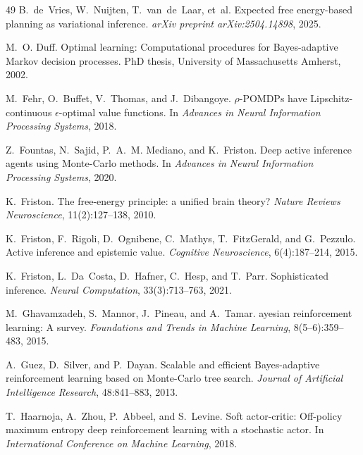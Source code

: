 \documentclass[runningheads]{llncs}
\begin{document}
\begin{thebibliography}{49}
B.~de~Vries, W.~Nuijten, T.~van~de~Laar, et~al.
\newblock Expected free energy-based planning as variational inference.
\newblock \emph{arXiv preprint arXiv:2504.14898}, 2025.

M.~O. Duff.
\newblock Optimal learning: Computational procedures for {B}ayes-adaptive {M}arkov decision processes.
\newblock PhD thesis, University of Massachusetts Amherst, 2002.

M.~Fehr, O.~Buffet, V.~Thomas, and J.~Dibangoye.
\newblock $\rho$-{POMDP}s have {L}ipschitz-continuous $\epsilon$-optimal value functions.
\newblock In \emph{Advances in Neural Information Processing Systems}, 2018.

Z.~Fountas, N.~Sajid, P.~A.~M. Mediano, and K.~Friston.
\newblock Deep active inference agents using {M}onte-{C}arlo methods.
\newblock In \emph{Advances in Neural Information Processing Systems}, 2020.

K.~Friston.
\newblock The free-energy principle: a unified brain theory?
\newblock \emph{Nature Reviews Neuroscience}, 11(2):127--138, 2010.

K.~Friston, F.~Rigoli, D.~Ognibene, C.~Mathys, T.~FitzGerald, and G.~Pezzulo.
\newblock Active inference and epistemic value.
\newblock \emph{Cognitive Neuroscience}, 6(4):187--214, 2015.

K.~Friston, L.~Da~Costa, D.~Hafner, C.~Hesp, and T.~Parr.
\newblock Sophisticated inference.
\newblock \emph{Neural Computation}, 33(3):713--763, 2021.

M.~Ghavamzadeh, S.~Mannor, J.~Pineau, and A.~Tamar.
ayesian reinforcement learning: A survey.
\newblock \emph{Foundations and Trends in Machine Learning}, 8(5--6):359--483, 2015.

A.~Guez, D.~Silver, and P.~Dayan.
\newblock Scalable and efficient {B}ayes-adaptive reinforcement learning based on {M}onte-{C}arlo tree search.
\newblock \emph{Journal of Artificial Intelligence Research}, 48:841--883, 2013.

T.~Haarnoja, A.~Zhou, P.~Abbeel, and S.~Levine.
\newblock Soft actor-critic: Off-policy maximum entropy deep reinforcement learning with a stochastic actor.
\newblock In \emph{International Conference on Machine Learning}, 2018.


\end{thebibliography}
\end{document}
